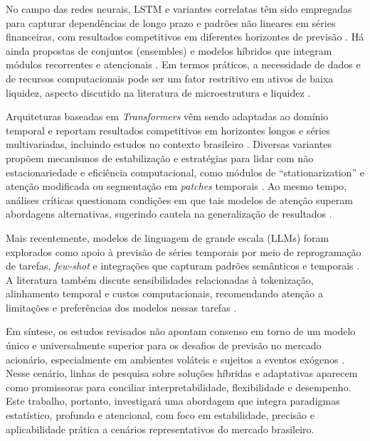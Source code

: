 No campo das redes neurais, LSTM e variantes correlatas têm sido empregadas para capturar dependências de longo prazo e padrões não lineares em séries financeiras, com resultados competitivos em diferentes horizontes de previsão \cite{hochreiter_1997,siami2018arima_vs_lstm,fjellstrom2022ensemble}. Há ainda propostas de conjuntos (ensembles) e modelos híbridos que integram módulos recorrentes e atencionais \cite{kabir2025lstm_trans_mlp}. Em termos práticos, a necessidade de dados e de recursos computacionais pode ser um fator restritivo em ativos de baixa liquidez, aspecto discutido na literatura de microestrutura e liquidez \cite{amihud2002illiquidity}.

Arquiteturas baseadas em \emph{Transformers} vêm sendo adaptadas ao domínio temporal e reportam resultados competitivos em horizontes longos e séries multivariadas, incluindo estudos no contexto brasileiro \cite{wen2022survey,costa2023ibovespa}. Diversas variantes propõem mecanismos de estabilização e estratégias para lidar com não estacionariedade e eficiência computacional, como módulos de ``stationarization'' e atenção modificada \cite{liu2022nonstationary} ou segmentação em \emph{patches} temporais \cite{nie2023patchtst}. Ao mesmo tempo, análises críticas questionam condições em que tais modelos de atenção superam abordagens alternativas, sugerindo cautela na generalização de resultados \cite{zeng2022effectiveness}.

Mais recentemente, modelos de linguagem de grande escala (LLMs) foram explorados como apoio à previsão de séries temporais por meio de reprogramação de tarefas, \emph{few-shot} e integrações que capturam padrões semânticos e temporais \cite{lathuilere2024timegpt,chang2023llm4ts,jin2023time_llm, noguer2024llm_financial,tang2025llm_ps}. A literatura também discute sensibilidades relacionadas à tokenização, alinhamento temporal e custos computacionais, recomendando atenção a limitações e preferências dos modelos nessas tarefas \cite{tang2024llm_properties}.

Em síntese, os estudos revisados não apontam consenso em torno de um modelo único e universalmente superior para os desafios de previsão no mercado acionário, especialmente em ambientes voláteis e sujeitos a eventos exógenos \cite{makridakis2018statistical,wen2022survey}. Nesse cenário, linhas de pesquisa sobre soluções híbridas e adaptativas aparecem como promissoras para conciliar interpretabilidade, flexibilidade e desempenho. Este trabalho, portanto, investigará uma abordagem que integra paradigmas estatístico, profundo e atencional, com foco em estabilidade, precisão e aplicabilidade prática a cenários representativos do mercado brasileiro. 

